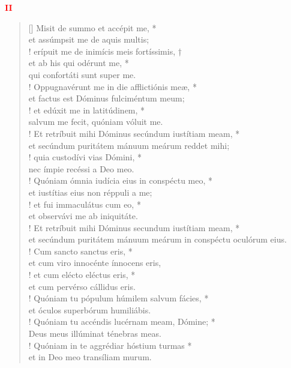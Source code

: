 \begin{center}
\textcolor{red}{\bf II}\\
\end{center}
\begin{verse}[\versewidth]
\vin Misit de summo et accépit me, *\\
\vin et assúmpsit me de aquis multis;\\!
erípuit me de inimícis meis fortíssimis, †\\
et ab his qui odérunt me, *\\
qui confortáti sunt super me.\\!
\vin Oppugnavérunt me in die afflictiónis meæ, *\\
\vin et factus est Dóminus fulciméntum meum;\\!
et edúxit me in latitúdinem, *\\
salvum me fecit, quóniam vóluit me.\\!
\vin Et retríbuit mihi Dóminus secúndum iustítiam meam, *\\
\vin et secúndum puritátem mánuum meárum reddet mihi;\\!
quia custodívi vias Dómini, *\\
nec ímpie recéssi a Deo meo.\\!
\vin Quóniam ómnia iudícia eius in conspéctu meo, *\\
\vin et iustítias eius non réppuli a me;\\!
et fui immaculátus cum eo, *\\
et observávi me ab iniquitáte.\\!
\vin Et retríbuit mihi Dóminus secundum iustítiam meam, *\\
\vin et secúndum puritátem mánuum meárum in conspéctu oculórum eius.\\!
Cum sancto sanctus eris, *\\
et cum viro innocénte ínnocens eris,\\!
\vin et cum elécto eléctus eris, *\\
\vin et cum pervérso cállidus eris.\\!
Quóniam tu pópulum húmilem salvum fácies, *\\
et óculos superbórum humiliábis.\\!
\vin Quóniam tu accéndis lucérnam meam, Dómine; *\\
\vin Deus meus illúminat ténebras meas.\\!
Quóniam in te aggrédiar hóstium turmas *\\
et in Deo meo transíliam murum.\\
\end{verse}
